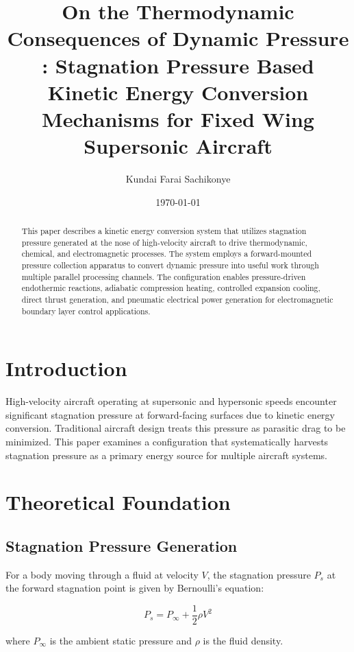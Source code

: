 \documentclass[12pt,a4paper]{article}
\title{On the Thermodynamic Consequences of Dynamic Pressure : Stagnation Pressure Based Kinetic Energy Conversion Mechanisms for Fixed Wing Supersonic Aircraft}
\author{Kundai Farai Sachikonye}
\date{\today}
\begin{document}
\maketitle

\begin{abstract}
This paper describes a kinetic energy conversion system that utilizes stagnation pressure generated at the nose of high-velocity aircraft to drive thermodynamic, chemical, and electromagnetic processes. The system employs a forward-mounted pressure collection apparatus to convert dynamic pressure into useful work through multiple parallel processing channels. The configuration enables pressure-driven endothermic reactions, adiabatic compression heating, controlled expansion cooling, direct thrust generation, and pneumatic electrical power generation for electromagnetic boundary layer control applications.
\end{abstract}

\section{Introduction}

High-velocity aircraft operating at supersonic and hypersonic speeds encounter significant stagnation pressure at forward-facing surfaces due to kinetic energy conversion. Traditional aircraft design treats this pressure as parasitic drag to be minimized. This paper examines a configuration that systematically harvests stagnation pressure as a primary energy source for multiple aircraft systems.

\section{Theoretical Foundation}

\subsection{Stagnation Pressure Generation}

For a body moving through a fluid at velocity $V$, the stagnation pressure $P_s$ at the forward stagnation point is given by Bernoulli's equation:

\begin{equation}
P_s = P_\infty + \frac{1}{2}\rho V^2
\end{equation}

where $P_\infty$ is the ambient static pressure and $\rho$ is the fluid density.
\end{document}
